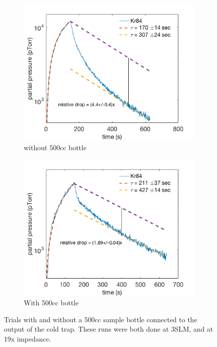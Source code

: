 \documentclass[12pt]{article}
\begin{document}
\begin{figure}[h!]
\centering
\begin{subfigure}{0.5\textwidth}
  \centering
  \includegraphics[width=\textwidth]{Figures/post_flow_transient_nobottle.png}
  \caption{without 500cc bottle}
\end{subfigure}%
\begin{subfigure}{0.5\textwidth}
  \centering
  \includegraphics[width=\textwidth]{Figures/post_flow_transient_wbottle.png}
  \caption{With 500cc bottle}
\end{subfigure}
\caption{Trials with and without a 500cc sample bottle connected to the output of the cold trap. These runs were both done at 3SLM, and at 19x impedance.} 
\label{fig:transientdrop}
\end{figure}
\end{document}
